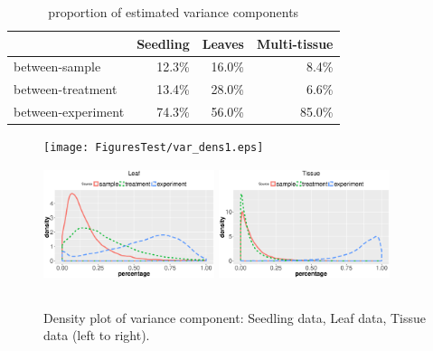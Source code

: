 \documentclass[11pt, a4paper]{article}
\begin{document}
 \begin{center} \begin{table}[h!] \centering \caption{proportion of estimated
     variance components} \label{table:percentageofvariation}
     \begin{tabular}{lrrr}\hline & Seedling & Leaves & Multi-tissue \\  \hline
	 between-sample     & 12.3\%   & 16.0\% & 8.4\%           \\
	 between-treatment  & 13.4\%   & 28.0\% & 6.6\%           \\
	 between-experiment & 74.3\%   & 56.0\% & 85.0\%         \\ \hline
     \end{tabular} \end{table} \end{center}

 \begin{figure}[h]
\begin{center}
\texttt{[image: FiguresTest/var\_dens1.eps]}
\includegraphics[width=5cm,height=4cm]{Figures/var_dens2.eps}
\includegraphics[width=5cm,height=4cm]{Figures/var_dens3.eps}
\caption{ Density plot of variance component: Seedling data, Leaf data, Tissue data (left to right).}
\label{fig:densityplot}
\end{center}
\end{figure} 
\end{document}
